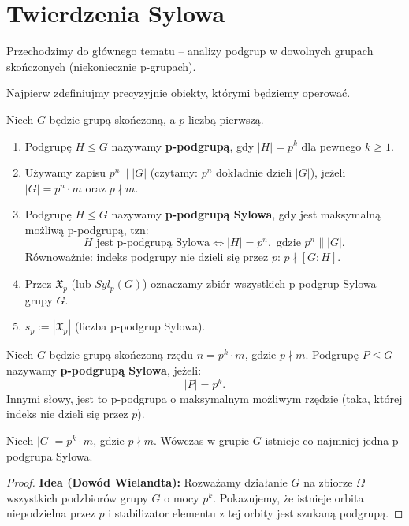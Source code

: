 \section{Twierdzenia Sylowa}

Przechodzimy do głównego tematu -- analizy podgrup w dowolnych grupach skończonych (niekoniecznie p-grupach).

Najpierw zdefiniujmy precyzyjnie obiekty, którymi będziemy operować.

\begin{definition}
    Niech $G$ będzie grupą skończoną, a $p$ liczbą pierwszą.
    \begin{enumerate}[label=\arabic*.]
        \item Podgrupę $H \le G$ nazywamy \textbf{p-podgrupą}, gdy $|H| = p^k$ dla pewnego $k \ge 1$.
        \item Używamy zapisu $p^n \parallel |G|$ (czytamy: $p^n$ dokładnie dzieli $|G|$), jeżeli $|G| = p^n \cdot m$ oraz $p \nmid m$.
        \item Podgrupę $H \le G$ nazywamy \textbf{p-podgrupą Sylowa}, gdy jest maksymalną możliwą p-podgrupą, tzn:
              \[ H \text{ jest p-podgrupą Sylowa} \iff |H| = p^n, \text{ gdzie } p^n \parallel |G|. \]
              Równoważnie: indeks podgrupy nie dzieli się przez $p$: $p \nmid [G:H]$.
        \item Przez $\mathfrak{X}_{p}$ (lub $Syl_p(G)$) oznaczamy zbiór wszystkich p-podgrup Sylowa grupy $G$.
        \item $s_p := |\mathfrak{X}_{p}|$ (liczba p-podgrup Sylowa).
    \end{enumerate}
\end{definition}

\begin{definition}
    Niech $G$ będzie grupą skończoną rzędu $n = p^k \cdot m$, gdzie $p \nmid m$.
    Podgrupę $P \le G$ nazywamy \textbf{p-podgrupą Sylowa}, jeżeli:
    \[ |P| = p^k. \]
    Innymi słowy, jest to p-podgrupa o maksymalnym możliwym rzędzie (taka, której indeks nie dzieli się przez $p$).
\end{definition}

\begin{theorem}
    Niech $|G| = p^k \cdot m$, gdzie $p \nmid m$. Wówczas w grupie $G$ istnieje co najmniej jedna p-podgrupa Sylowa.
\end{theorem}
\begin{proof}
    \textbf{Idea (Dowód Wielandta):} Rozważamy działanie $G$ na zbiorze $\Omega$ wszystkich podzbiorów grupy $G$ o mocy $p^k$. Pokazujemy, że istnieje orbita niepodzielna przez $p$ i stabilizator elementu z tej orbity jest szukaną podgrupą.
\end{proof}

